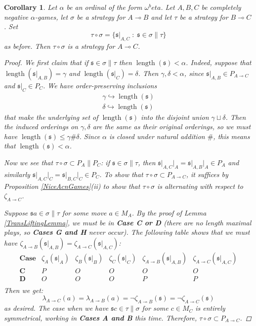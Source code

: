 \documentclass[11pt]{article} %
\theoremstyle{plain} %
\newtheorem{corollary}[theorem]{Corollary}
\theoremstyle{definition} %
\theoremstyle{note}
\theoremstyle{exercisestyle}
\renewcommand{\implies}{\multimap}
\newcommand{\comp}[2]{#1 \circ #2}
\newcommand{\suchthat}{\;\colon\;}
\newcommand{\s}{\mathfrak s}
\DeclareMathOperator{\length}{length}
\begin{document}
\begin{corollary}
  Let $\alpha$ be an ordinal of the form $\omega^beta$.  Let $A,B,C$ be completely negative $\alpha$-games, let $\sigma$ be a strategy for $A\implies B$ and let $\tau$ be a strategy for $B\implies C$.  Set
  \[
    \comp\tau\sigma = \{\s\vert_{A,C}\suchthat\s\in\sigma\|\tau\}
    \]
  as before.  Then $\comp\tau\sigma$ is a strategy for $A\implies C$.

  \begin{proof}
    We first claim that if $\s\in\sigma\|\tau$ then $\length(\s)<\alpha$.  Indeed, suppose that $\length(\s\vert_{A,B})=\gamma$ and $\length(\s\vert_C)=\delta$.  Then $\gamma,\delta<\alpha$, since $\s\vert_{A,B}\in P_{A\implies C}$ and $\s\vert_C\in P_C$.  We have order-preserving inclusions
    \begin{gather*}
      \gamma\hookrightarrow\length(\s)\\
      \delta\hookrightarrow\length(\s)
    \end{gather*}
    that make the underlying set of $\length(\s)$ into the disjoint union $\gamma\sqcup\delta$.  Then the induced orderings on $\gamma,\delta$ are the same as their original orderings, so we must have $\length(\s)\le\gamma\#\delta$.  Since $\alpha$ is closed under natural addition $\#$, this means that $\length(\s)<\alpha$.  

    Now we see that $\comp\tau\sigma\subset P_A\|P_C$: if $\s\in\sigma\|\tau$, then $\s\vert_{A,C}\vert_A=\s\vert_{A,B}\vert_A\in P_A$ and similarly $\s\vert_{A,C}\vert_C=\s\vert_{B,C}\vert_C\in P_C$.  To show that $\comp\tau\sigma\subset P_{A\implies C}$, it suffices by Proposition \ref{NiceAcnGames}(ii) to show that $\comp\tau\sigma$ is alternating with respect to $\zeta_{A\implies C}$.

    Suppose $\s a\in\sigma\|\tau$ for some move $a\in M_A$.  By the proof of Lemma \ref{TransLiftingLemma}, we must be in \textbf{Case C or D} (there are no length maximal plays, so \textbf{Cases G and H} never occur).  The following table shows that we must have $\zeta_{A\implies B}(\s\vert_{A,B})=\zeta_{A\implies C}(\s\vert_{A,C})$:
    \[
      \begin{array}{c|ccc|cc}
        \textbf{Case} & \zeta_A(\s\vert_A) & \zeta_B(\s\vert_B) & \zeta_C(\s\vert_C) & \zeta_{A\implies B}(\s\vert_{A,B}) & \zeta_{A\implies C}(\s\vert_{A,C}) \\
        \hline
        \textbf{C} & P & O & O & O & O \\
        \textbf{D} & O & O & O & P & P \\
      \end{array}
      \]
    Then we get:
    \[
      \lambda_{A\implies C}(a) = \lambda_{A\implies B}(a) = \neg\zeta_{A\implies B}(\s) = \neg\zeta_{A\implies C}(\s)
      \]
    as desired.  The case when we have $\s c\in\tau\|\sigma$ for some $c\in M_C$ is entirely symmetrical, working in \textbf{Cases A and B} this time.  Therefore, $\comp\tau\sigma\subset P_{A\implies C}$.  


\end{proof}
\end{corollary}
\end{document}
